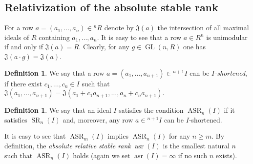 \documentclass[11pt]{amsart}
\theoremstyle{plain}
\numberwithin{equation}{section}
\numberwithin{lemma}{section}
\theoremstyle{definition}
\newtheorem{dfn}[lemma]{Definition}
\theoremstyle{remark}
\DeclareMathOperator{\GL}{GL}
\DeclareMathOperator{\SR}{SR}
\DeclareMathOperator{\asr}{asr}
\DeclareMathOperator{\ASR}{ASR}
\begin{document}
\subsection{Relativization of the absolute stable rank}\label{sec:rel-asr}
For a row $a=(a_1, \ldots, a_n)\in{}^n\!R$ denote by $\mathfrak{J}(a)$ the intersection of all maximal ideals of $R$ containing $a_1, \ldots, a_n$.
It is easy to see that a row $a\in R^n$ is unimodular if and only if $\mathfrak{J}(a)=R$. 
Clearly, for any $g\in\GL(n,R)$ one has $\mathfrak{J}(a\cdot g)=\mathfrak{J}(a)$.
\begin{dfn}\label{dfn:j-stable}
We say that a row $a=(a_1, \ldots, a_{n+1})\in{}^{n+1}\!I$ can be \emph{$I$-shortened}, if there exist $c_1, \ldots, c_n\in I$ such that
$\mathfrak{J}(a_1, \ldots, a_{n+1})=\mathfrak{J}(a_1+c_1a_{n+1}, \ldots, a_n+c_na_{n+1}).$
\end{dfn}
\begin{dfn}\label{dfn:asr}
We say that an ideal $I$ satisfies the condition $\ASR_n(I)$ if it satisfies $\SR_n(I)$ and, moreover, any row $a\in{}^{n+1}\!I$ can be $I$-shortened.
\end{dfn}

It is easy to see that $\ASR_m(I)$ implies $\ASR_n(I)$ for any $n\geqslant m$. 
By definition, the \emph{absolute relative stable rank} $\asr(I)$ is the smallest natural $n$ such that $\ASR_n(I)$ holds (again we set $\asr(I)=\infty$ if no such $n$ exists).
\end{document}
